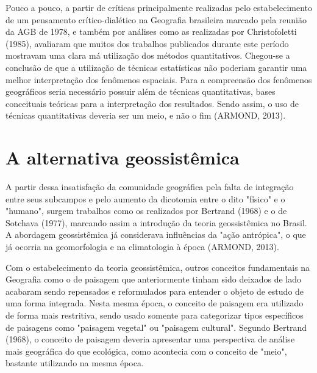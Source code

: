 Pouco a pouco, a partir de críticas principalmente realizadas pelo estabelecimento de um pensamento crítico-dialético na Geografia brasileira marcado pela reunião da AGB de 1978, e também por análises como as realizadas por Christofoletti (1985)\cite{CHRISTOFOLETTI}, avaliaram que muitos dos trabalhos publicados durante este período mostravam uma clara má utilização dos métodos quantitativos. Chegou-se a conclusão de que a utilização de técnicas estatísticas não poderiam garantir uma melhor interpretação dos fenômenos espaciais. Para a compreensão dos fenômenos geográficos seria necessário possuir além de técnicas quantitativas, bases conceituais teóricas para a interpretação dos resultados. Sendo assim, o uso de técnicas quantitativas deveria ser um meio, e não o fim (ARMOND, 2013)\cite{ARMOND}.

\section{A alternativa geossistêmica}
A partir dessa insatisfação da comunidade geográfica pela falta de integração entre seus subcampos e pelo aumento da dicotomia entre o dito "físico" e o "humano", surgem trabalhos como os realizados por Bertrand (1968)\cite{BERTRAND} e o de Sotchava (1977)\cite{SOTCHAVA}, marcando assim a introdução da teoria geossistêmica no Brasil. A abordagem geossistêmica já considerava influências da "ação antrópica", o que já ocorria na geomorfologia e na climatologia à época (ARMOND, 2013)\cite{ARMOND}.

Com o estabelecimento da teoria geossistêmica, outros conceitos fundamentais na Geografia como o de paisagem que anteriormente tinham sido deixados de lado acabaram sendo repensados e reformulados para entender o objeto de estudo de uma forma integrada. Nesta mesma época, o conceito de paisagem era utilizado de forma mais restritiva, sendo usado somente para categorizar tipos específicos de paisagens como "paisagem vegetal" ou "paisagem cultural". Segundo Bertrand (1968)\cite{BERTRAND}, o conceito de paisagem deveria apresentar uma perspectiva de análise mais geográfica do que ecológica, como acontecia com o conceito de "meio", bastante utilizando na mesma época.

